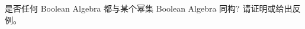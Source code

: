 \documentclass[a4paper, justified]{tufte-handout}
\begin{document}
\begin{solution}
\end{solution}


\beginoptional

\begin{problem}[Isomorphic]
  是否任何 Boolean Algebra 都与某个幂集 Boolean Algebra 同构?
  请证明或给出反例。
\end{problem}

\begin{solution}
\end{solution}

\beginot

\begin{ot}[]
\end{ot}

\vspace{0.50cm}
\begin{ot}[]
\end{ot}




\beginfb

\end{document}
